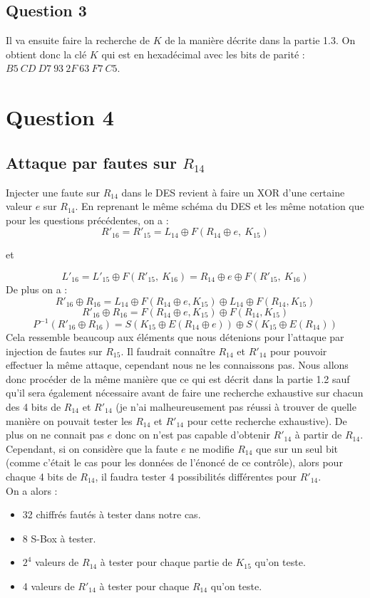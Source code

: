 \documentclass[10pt,a4paper]{article}
\begin{document}
\subsection{Question 3}
Il va ensuite faire la recherche de $K$ de la manière décrite dans la partie 1.3. 
On obtient donc la clé $K$ qui est en hexadécimal avec les bits de parité : $B5\ CD\ D7\ 93\ 2F\ 63\ F7\ C5$.

\section{Question 4}
\subsection{Attaque par fautes sur $R_{14}$}
Injecter une faute sur $R_{14}$ dans le DES revient à faire un XOR d'une certaine valeur $e$ sur $R_{14}$. En reprenant le même schéma du DES et les même notation que pour les questions précédentes, on a :
\[R'_{16} = R'_{15} = L_{14} \oplus F(R_{14} \oplus e,\ K_{15})\]
\begin{center}et\end{center}
\[L'_{16} = L'_{15} \oplus F(R'_{15},\ K_{16}) = R_{14} \oplus e \oplus F(R'_{15},\ K_{16})\]
De plus on a :
\[R'_{16} \oplus R_{16} = L_{14} \oplus F(R_{14} \oplus e, K_{15}) \oplus L_{14} \oplus F(R_{14}, K_{15})\]
\[R'_{16} \oplus R_{16} = F(R_{14} \oplus e, K_{15}) \oplus F(R_{14}, K_{15})\]
\[P^{-1}(R'_{16} \oplus R_{16}) = S(K_{15} \oplus E(R_{14} \oplus e)) \oplus S(K_{15} \oplus E(R_{14}))\]
Cela ressemble beaucoup aux éléments que nous détenions pour l'attaque par injection de fautes sur $R_{15}$. Il faudrait connaître $R_{14}$ et $R'_{14}$ pour pouvoir effectuer la même attaque, cependant nous ne les connaissons pas. Nous allons donc procéder de la même manière que ce qui est décrit dans la partie 1.2 sauf qu'il sera également nécessaire avant de faire une recherche exhaustive sur chacun des 4 bits de $R_{14}$ et $R'_{14}$ (je n'ai malheureusement pas réussi à trouver de quelle manière on pouvait tester les $R_{14}$ et $R'_{14}$ pour cette recherche exhaustive). De plus on ne connait pas $e$ donc on n'est pas capable d'obtenir $R'_{14}$ à partir de $R_{14}$. Cependant, si on considère que la faute $e$ ne modifie $R_{14}$ que sur un seul bit (comme c'était le cas pour les données de l'énoncé de ce contrôle), alors pour chaque 4 bits de $R_{14}$, il faudra tester 4 possibilités différentes pour $R'_{14}$.\\
On a alors :
\begin{itemize}
\item 32 chiffrés fautés à tester dans notre cas.
\item 8 S-Box à tester.
\item $2^{4}$ valeurs de $R_{14}$ à tester pour chaque partie de $K_{15}$ qu'on teste.
\item 4 valeurs de $R'_{14}$ à tester pour chaque $R_{14}$ qu'on teste.
\end{itemize}
\end{document}
